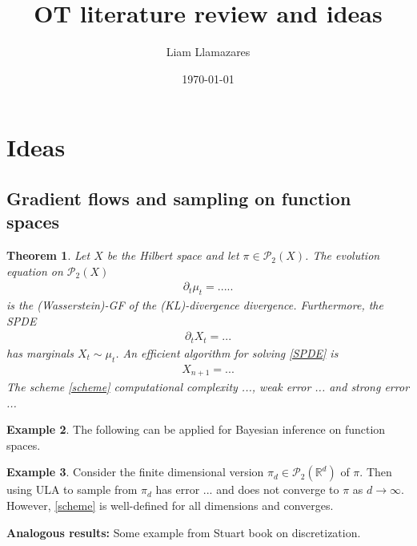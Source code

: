 \documentclass[
    a4paper,
    DIV=14,
    abstract=true,
    numbers=noenddot
]
{scrartcl}
\newtheorem{theorem}{Theorem}[section]
\theoremstyle{definition}
\newtheorem{example}[theorem]{Example}
\newcommand{\R}{\mathbb{R}}
\newcommand{\Pp}{\mathcal{P}}
\begin{document}
\title{OT literature review and ideas}
\author{Liam Llamazares}
\date{\today}
\maketitle
\section{Ideas}
\subsection{Gradient flows and sampling on function spaces}
\begin{theorem}
Let $X$ be the Hilbert space and let $\pi \in \Pp_2(X)$.  The evolution equation on $\Pp_2(X)$  
\begin{align}\label{evolution equation HS}
    \partial_t \mu_t = .....
\end{align}
is the (Wasserstein)-GF of the (KL)-divergence divergence. Furthermore, the SPDE 
\begin{align}\label{SPDE}
    \partial_t X_t = ...
\end{align}
has marginals $X_t \sim \mu_t$. An efficient algorithm for solving \eqref{SPDE} is 
\begin{align}\label{scheme}
    X_{n+1}=...
\end{align}
The scheme \eqref{scheme} computational complexity ..., weak error ... and strong error ...
\end{theorem}
\begin{example}
The following can be applied for Bayesian inference on function spaces.
\end{example}

\begin{example}
Consider the finite dimensional version $\pi_d \in \Pp_2(\R^d)$ of $\pi $. Then using ULA to sample from $\pi _d$ has error ... and does not converge to $\pi $  as $d \to \infty$. However, \eqref{scheme} is well-defined for all dimensions and converges.   
\end{example}
\textbf{Analogous results:} Some example from Stuart book on discretization. 
\end{document}

